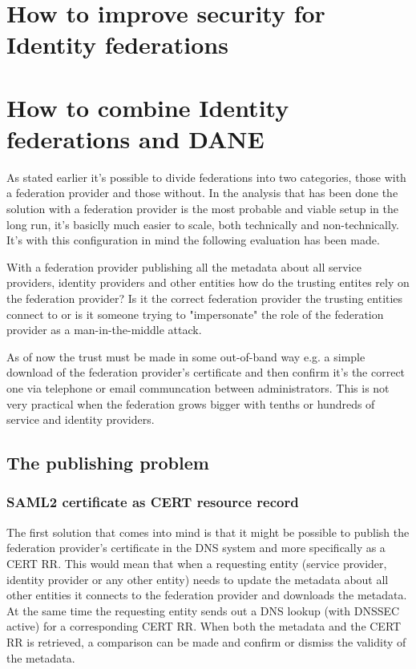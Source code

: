 \section{How to improve security for Identity federations}
\section{How to combine Identity federations and DANE}
As stated earlier it's possible to divide federations into two categories, those with a federation provider and those without.
In the analysis that has been done the solution with a federation provider is the most probable and viable setup in the long run, it's basiclly much easier to scale, both technically and non-technically.
It's with this configuration in mind the following evaluation has been made.


With a federation provider publishing all the metadata about all service providers, identity providers and other entities how do the trusting entites rely on the federation provider?
Is it the correct federation provider the trusting entities connect to or is it someone trying to "impersonate" the role of the federation provider as a man-in-the-middle attack.

As of now the trust must be made in some out-of-band way e.g. a simple download of the federation provider's certificate and then confirm it's the correct one via telephone or email communcation between administrators.  This is not very practical when the federation grows bigger with tenths or hundreds of service and identity providers.  
\subsection{The publishing problem}
\subsubsection{SAML2 certificate as CERT resource record}
\label{subsec:saml2-certificate-as-tlsa}
The first solution that comes into mind is that it might be possible to publish the federation provider's certificate in the DNS system and more specifically as a CERT RR\cite{rfc:4398}.
This would mean that when a requesting entity (service provider, identity provider or any other entity) needs to update the metadata about all other entities it connects to the federation provider and downloads the metadata.
At the same time the requesting entity sends out a DNS lookup (with DNSSEC active) for a corresponding CERT RR.
When both the metadata and the CERT RR is retrieved, a comparison can be made and confirm or dismiss the validity of the metadata.

